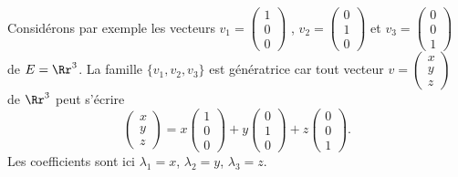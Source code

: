 \documentclass[class=report,crop=false]{standalone}
\begin{document}
\begin{exemple}
Considérons par exemple les vecteurs
$v_1=\left(\begin{smallmatrix}1\\0\\0\end{smallmatrix}\right)$ ,
$v_2=\left(\begin{smallmatrix}0\\1\\0\end{smallmatrix}\right)$ et
$v_3=\left(\begin{smallmatrix}0\\0\\1\end{smallmatrix}\right)$
de $E=\Rr^3$.
La famille $\{v_1,v_2,v_3\}$ est génératrice car tout
vecteur
$v=\left(\begin{smallmatrix}x\\y\\z\end{smallmatrix}\right)$ de $\Rr^3$ peut s'écrire
$$\left(\begin{smallmatrix}x\\y\\z\end{smallmatrix}\right)
=x\left(\begin{smallmatrix}1\\0\\0\end{smallmatrix}\right)
+y\left(\begin{smallmatrix}0\\1\\0\end{smallmatrix}\right)
+z\left(\begin{smallmatrix}0\\0\\1\end{smallmatrix}\right).$$
Les coefficients sont ici $\lambda_1=x$, $\lambda_2=y$, $\lambda_3=z$.
\end{exemple}
\end{document}
